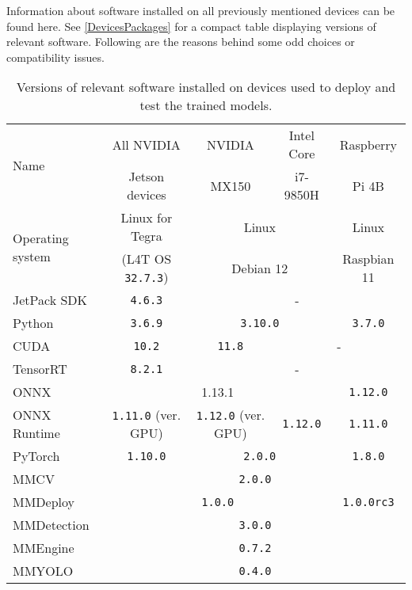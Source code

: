 Information about software installed on all previously mentioned devices can be
found here. See \autoref{DevicesPackages} for a compact table displaying
versions of relevant software. Following are the reasons behind some odd choices
or compatibility issues.

\begin{table}[t]
\centering
\small
\begin{tabular}{|l|c|c|c|c|}
    \hline
    \multirow{2}{*}{Name} & All NVIDIA     & NVIDIA & Intel Core  & Raspberry \\
                          & Jetson devices & MX150  & i7-9850H    & Pi 4B \\
    \hline
    \multirow{2}{*}{Operating system} & Linux for Tegra             & \multicolumn{2}{c|}{Linux}     & Linux   \\
                                      & (L4T OS \texttt{32.7.3}) & \multicolumn{2}{c|}{Debian 12} & Raspbian 11   \\
    \hline
    JetPack SDK      & \texttt{4.6.3}                     & \multicolumn{3}{c|}{-}  \\
    \hline
    Python           & \texttt{3.6.9}                     & \multicolumn{2}{c|}{\texttt{3.10.0}} & \texttt{3.7.0} \\
    \hline
    CUDA             & \texttt{10.2}                      & \texttt{11.8} & \multicolumn{2}{c|}{-} \\
    \hline
    TensorRT         & \texttt{8.2.1} & \multicolumn{3}{c|}{-}             \\
    \hline
    ONNX             & \multicolumn{3}{c|}{1.13.1} & \texttt{1.12.0}             \\
    \hline
    ONNX Runtime     & \texttt{1.11.0} (ver. GPU) & \texttt{1.12.0} (ver. GPU) & \texttt{1.12.0} & \texttt{1.11.0}            \\
    \hline
    PyTorch          & \texttt{1.10.0} & \multicolumn{2}{c|}{\texttt{2.0.0}} & \texttt{1.8.0} \\
    \hline
    MMCV             & \multicolumn{4}{c|}{\texttt{2.0.0}} \\
    \hline
    MMDeploy         & \multicolumn{3}{c|}{\texttt{1.0.0}} & \texttt{1.0.0rc3} \\
    \hline
    MMDetection      & \multicolumn{4}{c|}{\texttt{3.0.0}} \\
    \hline
    MMEngine         & \multicolumn{4}{c|}{\texttt{0.7.2}} \\
    \hline
    MMYOLO           & \multicolumn{4}{c|}{\texttt{0.4.0}} \\
    \hline
\end{tabular}
\caption{Versions of relevant software installed on devices used to deploy and test the trained models.}
\label{DevicesPackages}
\end{table}


